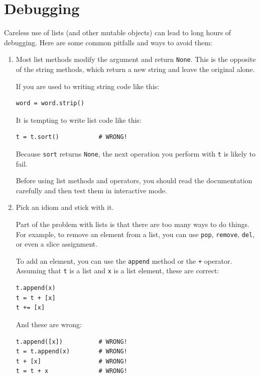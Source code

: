 \documentclass[10pt]{book}
\begin{document}
\section{Debugging}

Careless use of lists (and other mutable objects)
can lead to long hours of debugging.  Here are some common
pitfalls and ways to avoid them:

\begin{enumerate}

\item Most list methods modify the argument and
  return {\tt None}.  This is the opposite of the string methods,
  which return a new string and leave the original alone.

If you are used to writing string code like this:

\begin{verbatim}
word = word.strip()
\end{verbatim}

It is tempting to write list code like this:

\begin{verbatim}
t = t.sort()           # WRONG!
\end{verbatim}

Because {\tt sort} returns {\tt None}, the
next operation you perform with {\tt t} is likely to fail.

Before using list methods and operators, you should read the
documentation carefully and then test them in interactive mode.

\item Pick an idiom and stick with it.

Part of the problem with lists is that there are too many
ways to do things.  For example, to remove an element from
a list, you can use {\tt pop}, {\tt remove}, {\tt del},
or even a slice assignment.

To add an element, you can use the {\tt append} method or
the {\tt +} operator.  Assuming that {\tt t} is a list and
{\tt x} is a list element, these are correct:

\begin{verbatim}
t.append(x)
t = t + [x]
t += [x]
\end{verbatim}

And these are wrong:

\begin{verbatim}
t.append([x])          # WRONG!
t = t.append(x)        # WRONG!
t + [x]                # WRONG!
t = t + x              # WRONG!
\end{verbatim}


\end{enumerate}
\end{document}
